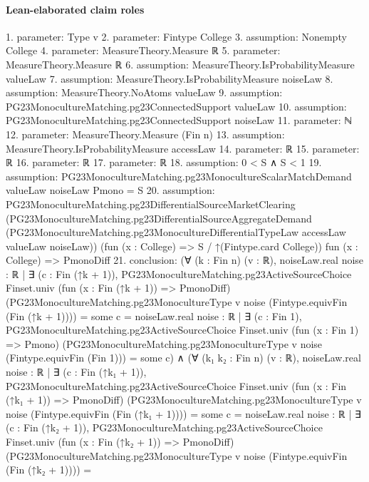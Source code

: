 \documentclass[10pt]{article}
\begin{document}
\paragraph{Lean-elaborated claim roles}\begin{ReviewVerbatim}
1. parameter: Type v
2. parameter: Fintype College
3. assumption: Nonempty College
4. parameter: MeasureTheory.Measure ℝ
5. parameter: MeasureTheory.Measure ℝ
6. assumption: MeasureTheory.IsProbabilityMeasure valueLaw
7. assumption: MeasureTheory.IsProbabilityMeasure noiseLaw
8. assumption: MeasureTheory.NoAtoms valueLaw
9. assumption: PG23MonocultureMatching.pg23ConnectedSupport valueLaw
10. assumption: PG23MonocultureMatching.pg23ConnectedSupport noiseLaw
11. parameter: ℕ
12. parameter: MeasureTheory.Measure (Fin n)
13. assumption: MeasureTheory.IsProbabilityMeasure accessLaw
14. parameter: ℝ
15. parameter: ℝ
16. parameter: ℝ
17. parameter: ℝ
18. assumption: 0 < S ∧ S < 1
19. assumption: PG23MonocultureMatching.pg23MonocultureScalarMatchDemand valueLaw noiseLaw Pmono = S
20. assumption: PG23MonocultureMatching.pg23DifferentialSourceMarketClearing
  (PG23MonocultureMatching.pg23DifferentialSourceAggregateDemand
    (PG23MonocultureMatching.pg23MonocultureDifferentialTypeLaw accessLaw valueLaw noiseLaw))
  (fun (x : College) => S / ↑(Fintype.card College)) fun (x : College) => PmonoDiff
21. conclusion: (∀ (k : Fin n) (v : ℝ),
    noiseLaw.real
        {noise : ℝ |
          ∃ (c : Fin (↑k + 1)),
            PG23MonocultureMatching.pg23ActiveSourceChoice Finset.univ (fun (x : Fin (↑k + 1)) => PmonoDiff)
                (PG23MonocultureMatching.pg23MonocultureType v noise (Fintype.equivFin (Fin (↑k + 1)))) =
              some c} =
      noiseLaw.real
        {noise : ℝ |
          ∃ (c : Fin 1),
            PG23MonocultureMatching.pg23ActiveSourceChoice Finset.univ (fun (x : Fin 1) => Pmono)
                (PG23MonocultureMatching.pg23MonocultureType v noise (Fintype.equivFin (Fin 1))) =
              some c}) ∧
  (∀ (k₁ k₂ : Fin n) (v : ℝ),
      noiseLaw.real
          {noise : ℝ |
            ∃ (c : Fin (↑k₁ + 1)),
              PG23MonocultureMatching.pg23ActiveSourceChoice Finset.univ (fun (x : Fin (↑k₁ + 1)) => PmonoDiff)
                  (PG23MonocultureMatching.pg23MonocultureType v noise (Fintype.equivFin (Fin (↑k₁ + 1)))) =
                some c} =
        noiseLaw.real
          {noise : ℝ |
            ∃ (c : Fin (↑k₂ + 1)),
              PG23MonocultureMatching.pg23ActiveSourceChoice Finset.univ (fun (x : Fin (↑k₂ + 1)) => PmonoDiff)
                  (PG23MonocultureMatching.pg23MonocultureType v noise (Fintype.equivFin (Fin (↑k₂ + 1)))) =
}
\end{ReviewVerbatim}
\end{document}
